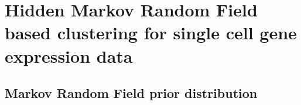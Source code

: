 \chapter{Hidden Markov Random Field based clustering for single cell gene expression data}\label{ch:clustering} 
\section{Markov Random Field prior distribution}




